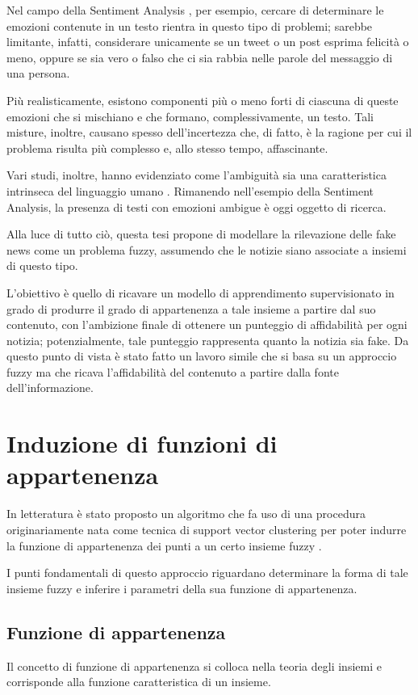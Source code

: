\documentclass[12pt]{report}
\theoremstyle{definition}
\begin{document}
Nel campo della Sentiment Analysis \cite{25}, per esempio, cercare di determinare le emozioni contenute in un testo rientra in questo tipo di problemi; sarebbe limitante, infatti, considerare unicamente se un tweet o un post esprima felicità o meno, oppure se sia vero o falso che ci sia rabbia nelle parole del messaggio di una persona.

Più realisticamente, esistono componenti più o meno forti di ciascuna di queste emozioni che si mischiano e che formano, complessivamente, un testo.
Tali misture, inoltre, causano spesso dell'incertezza che, di fatto, è la ragione per cui il problema risulta più complesso e, allo stesso tempo, affascinante.

Vari studi, inoltre, hanno evidenziato come l'ambiguità sia una caratteristica intrinseca del linguaggio umano \cite{26, 27}.
Rimanendo nell'esempio della Sentiment Analysis, la presenza di testi con emozioni ambigue è oggi oggetto di ricerca.

Alla luce di tutto ciò, questa tesi propone di modellare la rilevazione delle fake news come un problema fuzzy, assumendo che le notizie siano associate a insiemi di questo tipo.

L'obiettivo è quello di ricavare un modello di apprendimento supervisionato in grado di produrre il grado di appartenenza a tale insieme a partire dal suo contenuto, con l'ambizione finale di ottenere un punteggio di affidabilità per ogni notizia;
potenzialmente, tale punteggio rappresenta quanto la notizia sia fake. Da questo punto di vista è stato fatto un lavoro simile \cite{35} che si basa su un approccio fuzzy ma che ricava l'affidabilità del contenuto a partire dalla fonte dell'informazione.

\section{Induzione di funzioni di appartenenza} \label{induzione}
In letteratura è stato proposto un algoritmo che fa uso di una procedura originariamente nata come tecnica di support vector clustering per poter indurre la funzione di appartenenza dei punti a un certo insieme fuzzy \cite{1}.

I punti fondamentali di questo approccio riguardano determinare la forma di tale insieme fuzzy e inferire i parametri della sua funzione di appartenenza.

\subsection{Funzione di appartenenza} \label{membership}
Il concetto di funzione di appartenenza si colloca nella teoria degli insiemi e corrisponde alla funzione caratteristica di un insieme.
\end{document}
